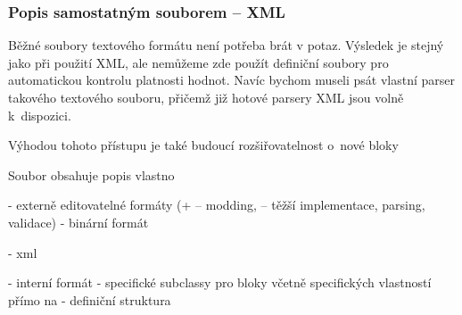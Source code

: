 \subsubsection{Popis samostatným souborem -- XML}
Běžné soubory textového formátu není potřeba brát v potaz. Výsledek je stejný jako při použití XML, ale nemůžeme zde použít definiční soubory pro automatickou kontrolu platnosti hodnot. Navíc bychom museli psát vlastní parser takového textového souboru, přičemž již hotové parsery XML jsou volně k~dispozici. 

Výhodou tohoto přístupu je také budoucí rozšiřovatelnost o~nové bloky

Soubor obsahuje popis vlastno

- externě editovatelné formáty (+ -- modding, -- těžší implementace, parsing, validace)
- binární formát

- xml


- interní formát
- specifické subclassy pro bloky včetně specifických vlastností přímo na 
- definiční struktura





